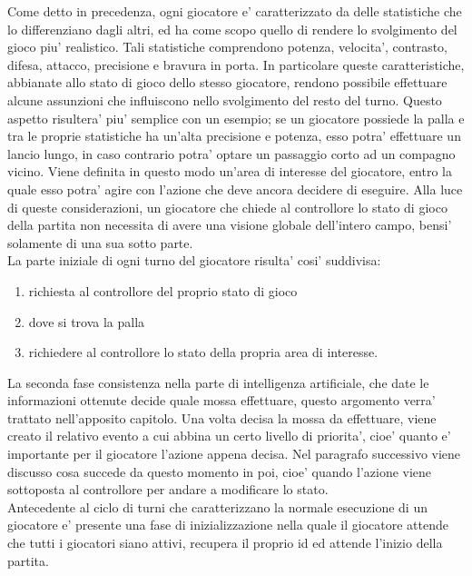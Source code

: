 Come detto in precedenza, ogni giocatore e’ caratterizzato da delle statistiche che lo differenziano dagli altri, ed ha come scopo quello di rendere lo svolgimento del gioco piu’ realistico. Tali statistiche comprendono potenza, velocita’, contrasto, difesa, attacco, precisione e bravura in porta. In particolare queste caratteristiche, abbianate allo stato di gioco dello stesso giocatore, rendono possibile effettuare alcune assunzioni che influiscono nello svolgimento del resto del turno. Questo aspetto risultera’ piu’ semplice con un esempio; se un giocatore possiede la palla e tra le proprie statistiche ha un’alta precisione e potenza, esso potra’ effettuare un lancio lungo, in caso contrario potra’ optare un passaggio corto ad un compagno vicino. Viene definita in questo modo un’area di interesse del giocatore, entro la quale esso potra’ agire con l’azione che deve ancora decidere di eseguire. Alla luce di queste considerazioni, un giocatore che chiede al controllore lo stato di gioco della partita non necessita di avere una visione globale dell’intero campo, bensi’ solamente di una sua sotto parte.\\

La parte iniziale di ogni turno del giocatore risulta’ cosi’ suddivisa:\\

\begin{enumerate}
	\item richiesta al controllore del proprio stato di gioco
	\item dove si trova la palla
	\item richiedere al controllore lo stato della propria area di interesse.
\end{enumerate}

La seconda fase consistenza nella parte di intelligenza artificiale, che date le informazioni ottenute decide quale mossa effettuare, questo argomento verra’ trattato nell’apposito capitolo. Una volta decisa la mossa da effettuare, viene creato il relativo evento a cui abbina un certo livello di priorita’, cioe’ quanto e’ importante per il giocatore l’azione appena decisa. Nel paragrafo successivo viene discusso cosa succede da questo momento in poi, cioe’ quando l’azione viene sottoposta al controllore per andare a modificare lo stato.\\

Antecedente al ciclo di turni che caratterizzano la normale esecuzione di un giocatore e’ presente una fase di inizializzazione nella quale il giocatore attende che tutti i giocatori siano attivi, recupera il proprio id ed attende l’inizio della partita.\\

